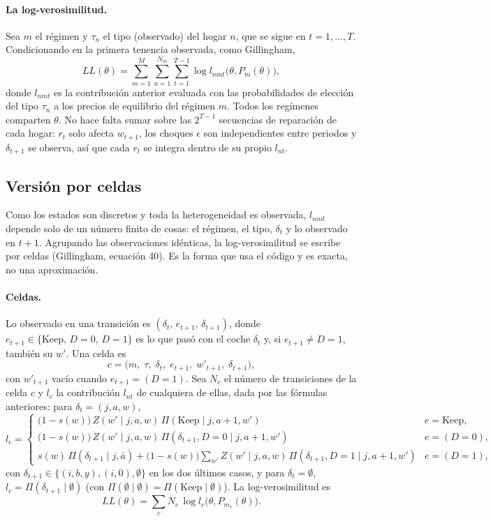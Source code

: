 \documentclass{article}
\begin{document}
\paragraph{La log-verosimilitud.} Sea $m$ el régimen y $\tau_n$ el tipo (observado) del hogar $n$, que se sigue en $t=1,\dots,T$. Condicionando en la primera tenencia observada, como Gillingham,
$$LL(\theta)=\sum_{m=1}^{M}\sum_{n=1}^{N_m}\sum_{t=1}^{T-1}\log l_{nmt}\big(\theta,P_m(\theta)\big),$$
donde $l_{nmt}$ es la contribución anterior evaluada con las probabilidades de elección del tipo $\tau_n$ a los precios de equilibrio del régimen $m$. Todos los regímenes comparten $\theta$. No hace falta sumar sobre las $2^{T-1}$ secuencias de reparación de cada hogar: $r_t$ solo afecta $w_{t+1}$, los choques $\epsilon$ son independientes entre periodos y $\delta_{t+1}$ se observa, así que cada $r_t$ se integra dentro de su propio $l_{nt}$.

\subsection*{Versión por celdas}

Como los estados son discretos y toda la heterogeneidad es observada, $l_{nmt}$ depende solo de un número finito de cosas: el régimen, el tipo, $\delta_t$ y lo observado en $t+1$. Agrupando las observaciones idénticas, la log-verosimilitud se escribe por celdas (Gillingham, ecuación 40). Es la forma que usa el código y es exacta, no una aproximación.

\paragraph{Celdas.} Lo observado en una transición es $(\delta_t,\,e_{t+1},\,\delta_{t+1})$, donde $e_{t+1}\in\{\text{Keep},\,D=0,\,D=1\}$ es lo que pasó con el coche $\delta_t$ y, si $e_{t+1}\neq D=1$, también su $w'$. Una celda es
$$c=\big(m,\;\tau,\;\delta_t,\;e_{t+1},\;w'_{t+1},\;\delta_{t+1}\big),$$
con $w'_{t+1}$ vacío cuando $e_{t+1}=(D=1)$. Sea $N_c$ el número de transiciones de la celda $c$ y $l_c$ la contribución $l_{nt}$ de cualquiera de ellas, dada por las fórmulas anteriores: para $\delta_t=(j,a,w)$,
$$l_c=\begin{cases}
\big(1-s(w)\big)\,Z(w'\mid j,a,w)\,\Pi(\text{Keep}\mid j,a+1,w') & e=\text{Keep},\\[4pt]
\big(1-s(w)\big)\,Z(w'\mid j,a,w)\,\Pi(\delta_{t+1},D=0\mid j,a+1,w') & e=(D=0),\\[4pt]
s(w)\,\Pi(\delta_{t+1}\mid j,\bar{a})+\big(1-s(w)\big)\displaystyle\sum_{w'}Z(w'\mid j,a,w)\,\Pi(\delta_{t+1},D=1\mid j,a+1,w') & e=(D=1),
\end{cases}$$
con $\delta_{t+1}\in\{(i,b,y),(i,0),\emptyset\}$ en los dos últimos casos, y para $\delta_t=\emptyset$, $l_c=\Pi(\delta_{t+1}\mid\emptyset)$ (con $\Pi(\emptyset\mid\emptyset)=\Pi(\text{Keep}\mid\emptyset)$). La log-verosimilitud es
$$LL(\theta)=\sum_{c}N_c\,\log l_c\big(\theta,P_{m_c}(\theta)\big).$$
\end{document}
